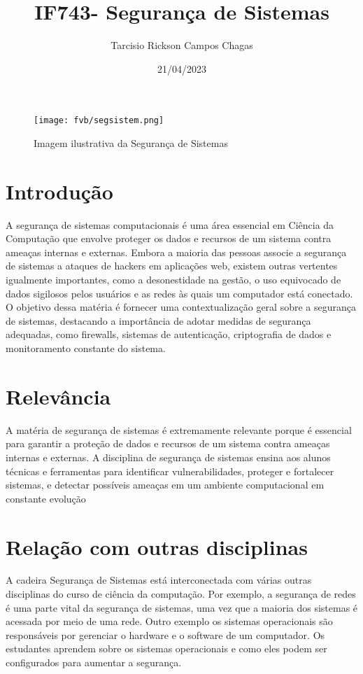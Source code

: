 \documentclass{article}
\title{IF743- Segurança de Sistemas}
\author{Tarcisio Rickson Campos Chagas }
\date{21/04/2023}
\begin{document}
\begin{figure}[h!]
\centering
\texttt{[image: fvb/segsistem.png]}
\caption{Imagem ilustrativa da Segurança de Sistemas}
\label{fig:segsistem.png}
\end{figure}
\section{Introdução}
A segurança de sistemas computacionais é uma área essencial em Ciência da Computação que envolve proteger os dados e recursos de um sistema contra ameaças internas e externas. Embora a maioria das pessoas associe a segurança de sistemas a ataques de hackers em aplicações web, existem outras vertentes igualmente importantes, como a desonestidade na gestão, o uso equivocado de dados sigilosos pelos usuários e as redes às quais um computador está conectado. O objetivo dessa matéria é fornecer uma contextualização geral sobre a segurança de sistemas, destacando a importância de adotar medidas de segurança adequadas, como firewalls, sistemas de autenticação, criptografia de dados e monitoramento constante do sistema.
\citep{author}
\section{Relevância}
A matéria de segurança de sistemas é extremamente relevante porque é essencial para garantir a proteção de dados e recursos de um sistema contra ameaças internas e externas. A disciplina de segurança de sistemas ensina aos alunos técnicas e ferramentas para identificar vulnerabilidades, proteger e fortalecer sistemas, e detectar possíveis ameaças em um ambiente computacional em constante evolução 
\citep{CinUFPE}
\section{Relação com outras disciplinas}
A cadeira Segurança de Sistemas está interconectada com várias outras disciplinas do curso de ciência da computação. Por exemplo, a segurança de redes é uma parte vital da segurança de sistemas, uma vez que a maioria dos sistemas é acessada por meio de uma rede. Outro exemplo os sistemas operacionais são responsáveis por gerenciar o hardware e o software de um computador. Os estudantes aprendem sobre os sistemas operacionais e como eles podem ser configurados para aumentar a segurança.
\citep{Perfil}
\


\end{document}
